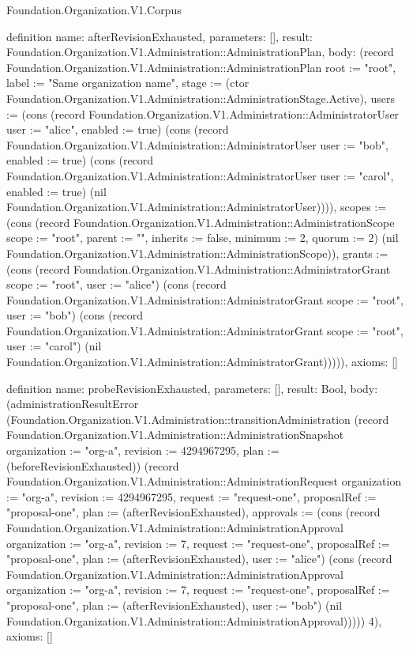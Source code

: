 \begin{lexlean}{Foundation.Organization.V1.Corpus}
\begin{semanticmodule}
definition{
  name: afterRevisionExhausted,
  parameters: [],
  result: Foundation.Organization.V1.Administration::AdministrationPlan,
  body: (record Foundation.Organization.V1.Administration::AdministrationPlan {root := "root", label := "Same organization name", stage := (ctor Foundation.Organization.V1.Administration::AdministrationStage.Active), users := (cons (record Foundation.Organization.V1.Administration::AdministratorUser {user := "alice", enabled := true}) (cons (record Foundation.Organization.V1.Administration::AdministratorUser {user := "bob", enabled := true}) (cons (record Foundation.Organization.V1.Administration::AdministratorUser {user := "carol", enabled := true}) (nil Foundation.Organization.V1.Administration::AdministratorUser)))), scopes := (cons (record Foundation.Organization.V1.Administration::AdministrationScope {scope := "root", parent := "", inherits := false, minimum := 2, quorum := 2}) (nil Foundation.Organization.V1.Administration::AdministrationScope)), grants := (cons (record Foundation.Organization.V1.Administration::AdministratorGrant {scope := "root", user := "alice"}) (cons (record Foundation.Organization.V1.Administration::AdministratorGrant {scope := "root", user := "bob"}) (cons (record Foundation.Organization.V1.Administration::AdministratorGrant {scope := "root", user := "carol"}) (nil Foundation.Organization.V1.Administration::AdministratorGrant))))}),
  axioms: []
}

definition{
  name: probeRevisionExhausted,
  parameters: [],
  result: Bool,
  body: (administrationResultError (Foundation.Organization.V1.Administration::transitionAdministration (record Foundation.Organization.V1.Administration::AdministrationSnapshot {organization := "org-a", revision := 4294967295, plan := (beforeRevisionExhausted)}) (record Foundation.Organization.V1.Administration::AdministrationRequest {organization := "org-a", revision := 4294967295, request := "request-one", proposalRef := "proposal-one", plan := (afterRevisionExhausted), approvals := (cons (record Foundation.Organization.V1.Administration::AdministrationApproval {organization := "org-a", revision := 7, request := "request-one", proposalRef := "proposal-one", plan := (afterRevisionExhausted), user := "alice"}) (cons (record Foundation.Organization.V1.Administration::AdministrationApproval {organization := "org-a", revision := 7, request := "request-one", proposalRef := "proposal-one", plan := (afterRevisionExhausted), user := "bob"}) (nil Foundation.Organization.V1.Administration::AdministrationApproval)))})) 4),
  axioms: []
}


\end{semanticmodule}
\end{lexlean}
